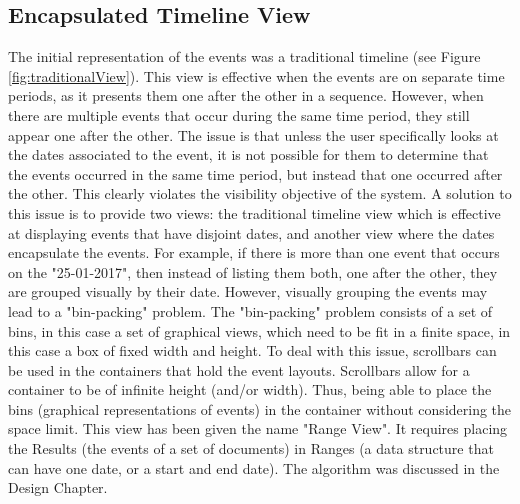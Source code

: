 \subsection{Encapsulated Timeline View}
\par The initial representation of the events was a traditional timeline (see Figure \ref{fig:traditionalView}). This view is effective when the events are on separate time periods, as it presents them one after the other in a sequence. However, when there are multiple events that occur during the same time period, they still appear one after the other. The issue is that unless the user specifically looks at the dates associated to the event, it is not possible for them to determine that the events occurred in the same time period, but instead that one occurred after the other. This clearly violates the visibility objective of the system. A solution to this issue is to provide two views: the traditional timeline view which is effective at displaying events that have disjoint dates, and another view where the dates encapsulate the events. For example, if there is more than one event that occurs on the "25-01-2017", then instead of listing them both, one after the other, they are grouped visually by their date. However, visually grouping the events may lead to a "bin-packing" problem. The "bin-packing" problem consists of a set of bins, in this case a set of graphical views, which need to be fit in a finite space, in this case a box of fixed width and height. To deal with this issue, scrollbars can be used in the containers that hold the event layouts. Scrollbars allow for a container to be of infinite height (and/or width). Thus, being able to place the bins (graphical representations of events) in the container without considering the space limit. This view has been given the name "Range View". It requires placing the Results (the events of a set of documents) in Ranges (a data structure that can have one date, or a start and end date). The algorithm was discussed in the Design Chapter.

